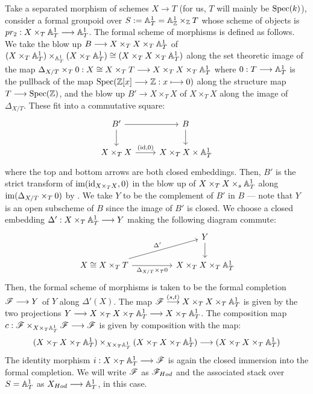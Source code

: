 \documentclass[11pt]{amsart}
\begin{document}
\begin{exm}
\label{exm:Hodge-st}
Take a separated morphism of schemes $X \to T$ (for us, $T$ will
mainly be $\mathrm{Spec}(k)$),
consider a formal groupoid over $S := \mathbb{A}^1_T = \mathbb{A}^1_\mathbb{Z} \times_\mathbb{Z} T$
whose scheme of objects
is $pr_2 : X \times_T \bA^1_T \to \bA^1_T$. The formal scheme of morphisms is
defined as follows. We take the blow up $B \to X \times_T X \times_T \bA^1_T$ of
$(X \times_T \mathbb{A}^1_T) \times_{\mathbb{A}^1_T} (X \times_T \mathbb{A}^1_T)
\cong (X \times_T X \times_T \mathbb{A}^1_T)$ along the set theoretic image of the
map
$\Delta_{X/T} \times_T 0 : X \cong X \times_T T
\to X \times_T X \times_T \bA^1_T$ where
$0 : T \to \bA^1_T$ is the pullback of the map
$\Spec(\bZ[x] \to \bZ : x \mapsto 0)$ along the structure map
$T \to \Spec(\bZ)$,
and the blow up $B' \to X \times_T X$ of $X \times_T X$ along the image of
$\Delta_{X/T}$.
These fit into a commutative square:
\[\begin{tikzcd}
B' \ar[r] \ar[d] &
B \ar[d] \\
X \times_T X  \ar[r, "{(\id, 0)}"] & X \times_T X \times \bA^1_T
\end{tikzcd}\]
where the top and bottom arrows are both closed embeddings.
Then, $B'$ is the strict transform of $\mathrm{im}(\mathrm{id}_{X \times_T X}, 0)$
in the blow up of $X \times_T X \times_s \mathbb{A}^1_T$ along
$\mathrm{im}(\Delta_{X/T} \times_T 0)$ by
\cite[\href{https://stacks.math.columbia.edu/tag/080E}{Lemma 080E}]
{stacks-project}.
We take $Y$ to be the complement of $B'$ in $B$ --- note that
$Y$ is an open subscheme of $B$ since the image of $B'$ is closed.
We choose a closed embedding $\Delta' : X \times_T \bA^1_T \to Y$ making
the following diagram commute:
\[\begin{tikzcd}[column sep=huge]
& Y \ar[d] \\
X \cong X \times_T T
  \ar[r, "\Delta_{X/T} \times_T 0" below]
  \ar[ru, "\Delta'" above left] &
X \times_T X \times_T \bA^1_T
\end{tikzcd}\]
Then, the formal scheme of morphisms is taken to be the formal completion
$\sF \to Y$ of $Y$ along $\Delta'(X)$. The map
$\sF \to[{(s, t)}] X \times_T X \times_T \bA^1_T$ is given by the two
projections $Y \to X \times_T X \times_T \bA^1_T \to X \times_T \bA^1_T$.
The composition map $c : \sF \times_{X \times_T \bA^1_T} \sF \to \sF$
is given by composition with the map:
\[
(X \times_T X \times_T \bA^1_T) \times_{X \times_T \bA^1_T}
(X \times_T X \times_T \bA^1_T) \to (X \times_T X \times_T \bA^1_T)
\]
The identity morphism $i : X \times_T \bA^1_T \to \sF$
is again the closed immersion into the formal completion.
We will write $\mathscr{F}$ as $\mathscr{F}_{Hod}$ and the associated stack over $S = \mathbb{A}^1_T$
as $X_{Hod} \to \bA^1_T$, in this case.
\end{exm}
\end{document}
